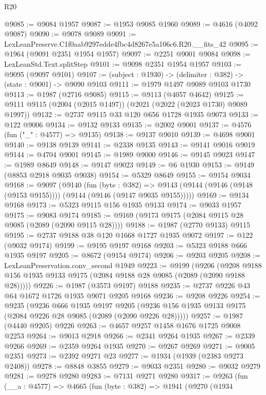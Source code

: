 \begin{lexlean}{R20}
\begin{coremodule}
@9085 := @9084 @1957
@9087 := @1953 @9085 @1960
@9089 := @4616 (@4092 @9087)
@9090 := @9078 @9089
@9091 := LexLeanPreserve.C1f0aab9297edde4fbc4d8267e5a106c6.R20.__fits_42
@9095 := @1964 (@9091 @2351 @1954 @1957)
@9097 := @2251 @9001 @9084
@9098 := LexLeanStd.Text.splitStep
@9101 := @9098 @2351 @1954 @1957
@9103 := @9095 (@9097 @9101)
@9107 := (subject : @1930) -> (delimiter : @382) -> (state : @9001) -> @9090 @9103
@9111 := @1979 @1497 @9089 @9103 @1730
@9113 := @1987 (@2716 @9085)
@9115 := @9113 (@4057 @4642)
@9125 := @9111 @9115 (@2004 (@2015 @1497)) (@2021 (@2022 (@2023 @1730) @9089 @1997))
@9132 := @2737 @9115 @33 @120 @656 @1728 @1935 @9073
@9133 := @122 @9006
@9134 := @9132 @9133
@9135 := @2002 @9001
@9137 := @4576 (fun ("_" : @4577) => @9135)
@9138 := @9137 @9010
@9139 := @4698 @9001
@9140 := @9138 @9139
@9141 := @2338 @9135
@9143 := @9141 @9016 @9019
@9144 := @4704 @9001
@9145 := @1989 @9000
@9146 := @9145 @9023
@9147 := @1989 @8649
@9148 := @9147 @9023
@9149 := @6 @1930
@9153 := @9149 (@8853 @2918 @9035 @9038)
@9154 := @5329 @8649
@9155 := @9154 @9034
@9168 := @9097
    (@9140
      (fun (byte : @382) =>
      @9143 (@9144 (@9146 (@9148 (@9153 @9155)))) (@9144 (@9146 (@9147 @9035 @9155)))))
@9169 := @9134 @9168
@9173 := @5323 @9115 @156 @1935 @9133
@9174 := @9033 @1957
@9175 := @9083 @9174
@9185 := @9169 (@9173 @9175 (@2084 @9115 @28 @9085 (@2089 (@2090 @9115 @28))))
@9188 := @1987 (@2770 @9133) @9115
@9195 := @2737 @9188 @38 @120 @1668 @1727 @1935 @9072
@9197 := @122 (@9032 @9174)
@9199 := @9195 @9197 @9168
@9203 := @5323 @9188 @666 @1935 @9197
@9205 := @8672 (@9154 @9174)
@9206 := @9203 @9205
@9208 := LexLeanPreservation.conv_second @1949
@9223 := @9199
    (@9206 (@9208 @9188 @156 @1935 @9133 @9175 (@2084 @9188 @28 @9085 (@2089 (@2090 @9188 @28)))))
@9226 := @1987 (@3573 @9197) @9188
@9235 := @2737 @9226 @43 @64 @1672 @1726 @1935 @9071 @9205 @9168
@9236 := @9208 @9226
@9254 := @9235
    (@9236
      @666
      @1935
      @9197
      @9205
      (@9236 @156 @1935 @9133 @9175 (@2084 @9226 @28 @9085 (@2089 (@2090 @9226 @28)))))
@9257 := @1987 (@4440 @9205) @9226
@9263 := @4657 @9257 @1458 @1676 @1725 @9008 @2253
@9264 := @9013 @2918
@9266 := @2341 @9264 @1935
@9267 := @2339 @9266
@9269 := @2359 @9264 @1935
@9270 := @9267 @9269
@9271 := @9005 @2351
@9273 := @2392 @9271 @23
@9277 := @1934 (@1939 (@2383 @9273 @2408))
@9278 := @8848 @3855
@9279 := @9033 @2351
@9280 := @9032 @9279
@9281 := @9278 @9280
@9283 := @7131 @9271 @9280
@9317 := @9263
    (fun (__a : @4577) =>
    @4665
      (fun (byte : @382) =>
      @1941
        (@9270
          (@1934

\end{coremodule}
\end{lexlean}

